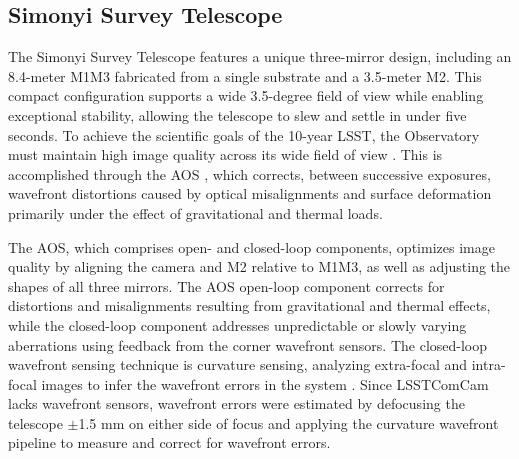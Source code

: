 
\subsection{Simonyi Survey Telescope
\label{ssec:simonyi}}
The Simonyi Survey Telescope \citep{2024SPIE13094E..09S} features a unique three-mirror design, including an 8.4-meter \gls{M1M3} fabricated from a single substrate and a 3.5-meter \gls{M2}.
This compact \gls{configuration} supports a wide 3.5-degree field of view while enabling exceptional stability, allowing the telescope to slew and settle in under five seconds.
To achieve the scientific goals of the 10-year \gls{LSST}, the Observatory must maintain high image quality across its wide field of view \citep{2008arXiv0805.2366I}.
This is accomplished through the \gls{AOS} \citep{2015ApOpt..54.9045X,2024SPIE13094E..3NM}, which corrects, between successive exposures, wavefront distortions caused by optical misalignments and surface deformation primarily under the effect of gravitational and thermal loads.

The \gls{AOS}, which comprises open- and closed-loop components, optimizes image quality by aligning the camera and \gls{M2} relative to \gls{M1M3}, as well as adjusting the shapes of all three mirrors.
The \gls{AOS} open-loop component corrects for distortions and misalignments resulting from gravitational and thermal effects, while the closed-loop component addresses unpredictable or slowly varying aberrations using feedback from the corner wavefront sensors.
The closed-loop wavefront sensing technique is curvature sensing, analyzing extra-focal and intra-focal images to infer the wavefront errors in the system \citep{2023aoel.confE..67T}.
Since \gls{LSSTComCam} lacks wavefront sensors, wavefront errors were estimated by defocusing the telescope $\pm$1.5 mm on either side of focus and applying the curvature wavefront pipeline to measure and correct for wavefront errors.

